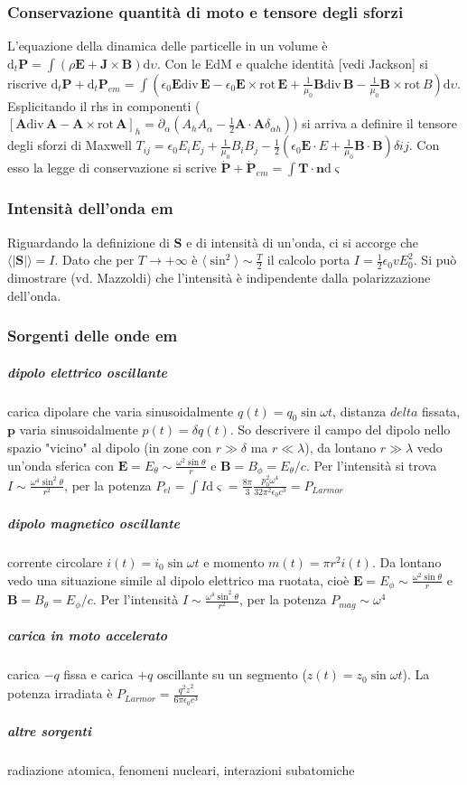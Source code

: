 \documentclass[11pt,a4paper]{article}
\newcommand{\de}{\mathrm d}
\newcommand{\dive}[1]{\text{div}\,#1}
\newcommand{\rot}[1]{\text{rot}\,#1}
\begin{document}
\subsubsection{Conservazione quantità di moto e tensore degli sforzi}
L'equazione della dinamica delle particelle in un volume è $\de_t \mathbf P = \int (\rho \mathbf E + \mathbf J \times \mathbf B) \de\upsilon$. Con le EdM e qualche identità [vedi Jackson] si riscrive $\de_t \mathbf P + \de_t \mathbf P_{em} = \int (\epsilon_0\mathbf E \dive\mathbf E - \epsilon_0\mathbf E \times \rot\mathbf E + \frac1{\mu_0}\mathbf B \dive\mathbf B - \frac1{\mu_0} \mathbf B \times \rot B)\de\upsilon$. Esplicitando il rhs in componenti ($[\mathbf A \dive\mathbf A - \mathbf A \times \rot\mathbf A]_h = \partial_\alpha(A_h A_\alpha - \frac12 \mathbf A\cdot\mathbf A \delta_{\alpha h})$) si arriva a definire il tensore degli sforzi di Maxwell $T_{ij} = \epsilon_0 E_i E_j + \frac1{\mu_0} B_i B_j - \frac12(\epsilon_0 \mathbf E \cdot E + \frac1{\mu_0} \mathbf B \cdot \mathbf B)\delta{ij}$. Con esso la legge di conservazione si scrive $\dot{\mathbf P} + \dot{\mathbf P}_{em} = \int \mathbf T \cdot \mathbf n \de\varsigma$

\subsubsection{Intensità dell'onda em}
Riguardando la definizione di $\mathbf S$ e di intensità di un'onda, ci si accorge che $\langle |\mathbf S| \rangle = I$. Dato che per $T \to +\infty$ è $\langle \sin^2 \rangle \sim \frac T2$ il calcolo porta $I = \frac12 \epsilon_0 v E_0^2$. Si può dimostrare (vd. Mazzoldi) che l'intensità è indipendente dalla polarizzazione dell'onda.

\subsubsection{Sorgenti delle onde em}
\subparagraph{dipolo elettrico oscillante} carica dipolare che varia sinusoidalmente $q(t) = q_0 \sin \omega t$, distanza $delta$ fissata, $\mathbf p$ varia sinusoidalmente $p(t) = \delta q(t)$. So descrivere il campo del dipolo nello spazio "vicino" al dipolo (in zone con $r \gg \delta$ ma $r \ll \lambda$), da lontano $r \gg \lambda$ vedo un'onda sferica con $\mathbf E = E_\theta \sim \frac{\omega^2 \sin\theta}r$ e $\mathbf B = B_\phi = E_\theta /c$. Per l'intensità si trova $I \sim \frac{\omega^4 \sin^2 \theta}{r^2}$, per la potenza $P_{el} = \int I \de\varsigma = \frac{8\pi}3 \frac{p_0^2 \omega^4}{32\pi^2 \epsilon_0 c^3} = P_{Larmor}$
\subparagraph{dipolo magnetico oscillante} corrente circolare $i(t) = i_0 \sin\omega t$ e momento $m(t) = \pi r^2 i(t)$. Da lontano vedo una situazione simile al dipolo elettrico ma ruotata, cioè $\mathbf E = E_\phi \sim \frac{\omega^2 \sin\theta}r$ e $\mathbf B = B_\theta = E_\phi /c$. Per l'intensità $I \sim \frac{\omega^4 \sin^2 \theta}{r^2}$, per la potenza $P_{mag} \sim \omega^4$
\subparagraph{carica in moto accelerato} carica $-q$ fissa e carica $+q$ oscillante su un segmento ($z(t) = z_0 \sin \omega t$). La potenza irradiata è $P_{Larmor} = \frac{q^2 \ddot z^2}{6\pi \epsilon_0 c^3}$
\subparagraph{altre sorgenti} radiazione atomica, fenomeni nucleari, interazioni subatomiche
\end{document}
